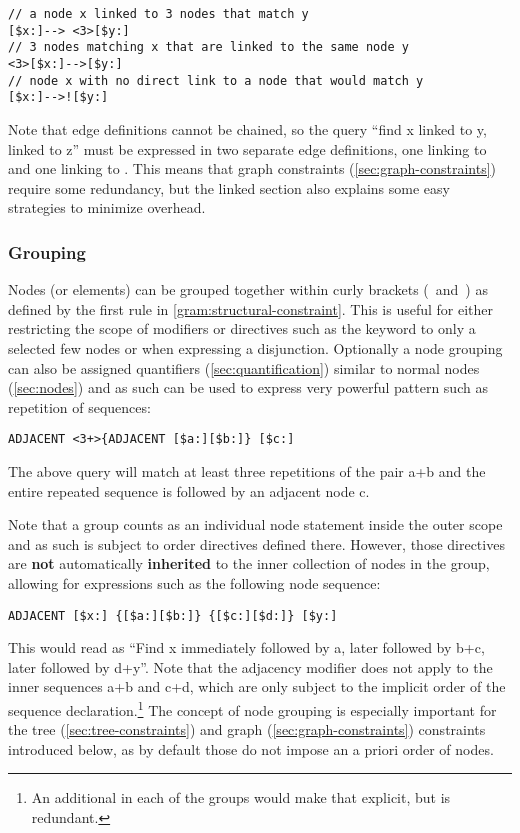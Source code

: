 \documentclass[11pt,a4paper]{report}
\begin{document}
\begin{Verbatim}[samepage=true]
// a node x linked to 3 nodes that match y
[$x:]--> <3>[$y:]
// 3 nodes matching x that are linked to the same node y   
<3>[$x:]-->[$y:]
// node x with no direct link to a node that would match y
[$x:]-->![$y:]
\end{Verbatim}

Note that edge definitions cannot be chained, so the query ``find x linked to y, linked to z'' must be expressed in two separate edge definitions, one linking  to  and one linking  to .
This means that graph constraints (\ref{sec:graph-constraints}) require some redundancy, but the linked section also explains some easy strategies to minimize overhead.

\subsubsection{Grouping}
\label{sec:node-grouping}
Nodes (or elements) can be grouped together within curly brackets (\lit{\{}~and~\lit{\}}) as defined by the first  rule in \cref{gram:structural-constraint}.
This is useful for either restricting the scope of modifiers or directives such as the  keyword to only a selected few nodes or when expressing a disjunction.
Optionally a node grouping can also be assigned quantifiers (\ref{sec:quantification}) similar to normal nodes (\ref{sec:nodes}) and as such can be used to express very powerful pattern such as repetition of sequences:
\begin{Verbatim}[samepage=true]
ADJACENT <3+>{ADJACENT [$a:][$b:]} [$c:]
\end{Verbatim}
The above query will match at least three repetitions of the pair a+b and the entire repeated sequence is followed by an adjacent node c.

Note that a group counts as an individual node statement inside the outer scope and as such is subject to order directives defined there.
However, those directives are \textbf{not} automatically \textbf{inherited} to the inner collection of nodes in the group, allowing for expressions such as the following node sequence:
\begin{Verbatim}[samepage=true]
ADJACENT [$x:] {[$a:][$b:]} {[$c:][$d:]} [$y:]
\end{Verbatim}
\noindent This would read as ``Find x immediately followed by a, later followed by b+c, later followed by d+y''.
Note that the adjacency modifier does not apply to the inner sequences a+b and c+d, which are only subject to the implicit order of the sequence declaration.\footnote{An additional  in each of the groups would make that explicit, but is redundant.}
The concept of node grouping is especially important for the tree (\ref{sec:tree-constraints}) and graph (\ref{sec:graph-constraints}) constraints introduced below, as by default those do not impose an a priori order of nodes.
\end{document}
